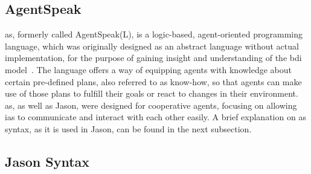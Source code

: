 \documentclass[draft,final]{vutinfth} %
\begin{document}
\subsection{AgentSpeak}
\label{chap:as}

\gls{as}, formerly called AgentSpeak(L), is a logic-based, agent-oriented programming language, which was originally designed as an abstract language without actual implementation, for the purpose of gaining insight and understanding of the \gls{bdi} model~\cite{rao1996agentspeak}. 
The language offers a way of equipping agents with knowledge about certain pre-defined plans, also referred to as know-how, so that agents can make use of those plans to fulfill their goals or react to changes in their environment. 
\gls{as}, as well as Jason, were designed for cooperative agents, focusing on allowing \glspl{ia} to communicate and interact with each other easily. 
A brief explanation on \gls{as} syntax, as it is used in Jason, can be found in the next subsection.

\subsection{Jason Syntax}
\label{chap:syntax}
\end{document}
